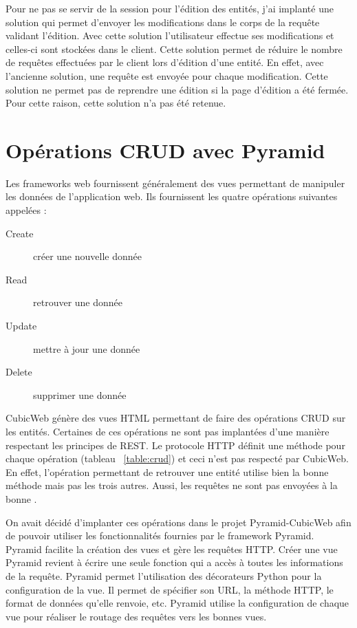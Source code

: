 Pour ne pas se servir de la session pour l'édition des entités, j'ai implanté
une solution qui permet d'envoyer les modifications dans le corps de la requête
validant l'édition. Avec cette solution l'utilisateur effectue ses
modifications et celles-ci sont stockées dans le client. Cette solution permet
de réduire le nombre de requêtes effectuées par le client lors d'édition d'une
entité. En effet, avec l'ancienne solution, une requête est envoyée pour chaque
modification. Cette solution ne permet pas de reprendre une édition si la page
d'édition a été fermée. Pour cette raison, cette solution n'a pas été retenue.

\section{Opérations CRUD avec Pyramid} Les frameworks web fournissent
généralement des vues permettant de manipuler les données de l'application web.
Ils fournissent les quatre opérations suivantes appelées  :

\begin{description} 
    \item[Create] créer une nouvelle donnée 
    \item[Read] retrouver une donnée 
    \item[Update] mettre à jour une donnée 
    \item[Delete] supprimer une donnée 
\end{description}

CubicWeb génère des vues HTML permettant de faire des opérations CRUD sur les
entités. Certaines de ces opérations ne sont pas implantées d'une manière
respectant les principes de REST. Le protocole HTTP définit une méthode pour
chaque opération (tableau ~\ref{table:crud}) et ceci n'est pas respecté par
CubicWeb. En effet, l'opération permettant de retrouver une entité utilise bien
la bonne méthode mais pas les trois autres. Aussi, les requêtes ne sont pas
envoyées à la bonne .

On avait décidé d'implanter ces opérations dans le projet Pyramid-CubicWeb afin
de pouvoir utiliser les fonctionnalités fournies par le framework Pyramid.
Pyramid facilite la création des vues et gère les requêtes HTTP. Créer une vue
Pyramid revient à écrire une seule fonction qui a accès à toutes les
informations de la requête. Pyramid permet l'utilisation des décorateurs Python
pour la configuration de la vue. Il permet de spécifier son URL, la méthode
HTTP, le format de données qu'elle renvoie, etc. Pyramid utilise la
configuration de chaque vue pour réaliser le routage des requêtes vers les
bonnes vues. 

